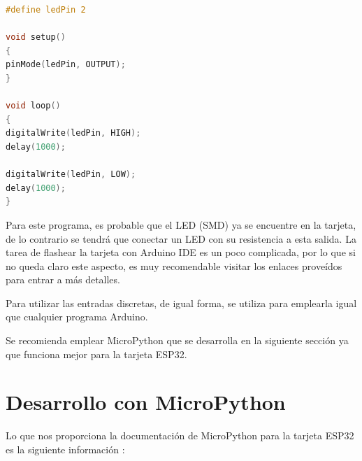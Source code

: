 \documentclass[conference]{IEEEtran}
\begin{document}
\begin{lstlisting}[language=C, caption={Programa que hace parpadear el LED en el pin 2}]
#define ledPin 2

void setup()
{
pinMode(ledPin, OUTPUT);
}

void loop()
{
digitalWrite(ledPin, HIGH);
delay(1000);

digitalWrite(ledPin, LOW);
delay(1000);
}
\end{lstlisting}

Para este programa, es probable que el LED (SMD) ya se encuentre en la tarjeta, de lo contrario se tendrá que conectar un LED con su resistencia a esta salida. La tarea de flashear la tarjeta con Arduino IDE es un poco complicada, por lo que si no queda claro este aspecto, es muy recomendable visitar los enlaces proveídos para entrar a más detalles.

\bigbreak

Para utilizar las entradas discretas, de igual forma, se utiliza  para emplearla igual que cualquier programa Arduino.

\bigbreak

Se recomienda emplear MicroPython que se desarrolla en la siguiente sección ya que funciona mejor para la tarjeta ESP32.

\section{Desarrollo con MicroPython}

Lo que nos proporciona la documentación de MicroPython para la tarjeta ESP32 es la siguiente información \cite{micropython-esp32}:
\end{document}
